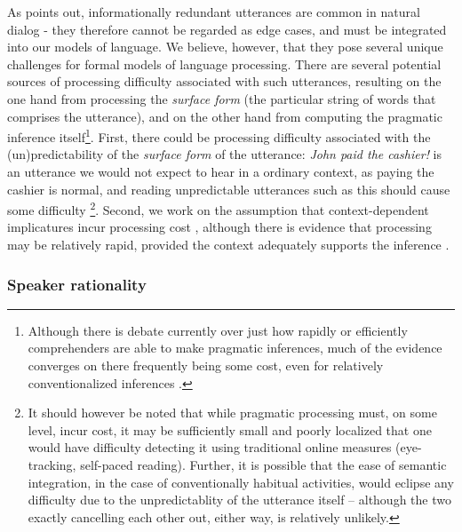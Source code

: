 As \citet{Walker1993} points out, informationally redundant utterances are
common in natural dialog - they therefore cannot be regarded as edge
cases, and must be integrated into our models of language. We believe,
however, that they pose several unique challenges for formal models of
language processing. There are several potential sources of processing
difficulty associated with such utterances, resulting on the one hand
from processing the \emph{surface form} (the particular string of words
that comprises the utterance), and on the other hand from computing the
pragmatic inference itself\footnote{Although there is debate currently
  over just how rapidly or efficiently comprehenders are able to make
  pragmatic inferences, much of the evidence converges on there
  frequently being some cost, even for relatively conventionalized
  inferences \citep{Degen2016}.}. First, there could be
processing difficulty associated with the (un)predictability of the
\emph{surface form} of the utterance: \emph{John paid the cashier!} is
an utterance we would not expect to hear in a ordinary context, as
paying the cashier is normal, and reading unpredictable utterances such
as this should cause some difficulty \citep{Smith2013}\footnote{It
  should however be noted that while pragmatic processing must, on some
  level, incur cost, it may be sufficiently small and poorly localized
  that one would have difficulty detecting it using traditional online
  measures (eye-tracking, self-paced reading). Further, it is possible
  that the ease of semantic integration, in the case of conventionally
  habitual activities, would eclipse any difficulty due to the
  unpredictablity of the utterance itself -- although the two exactly
  cancelling each other out, either way, is relatively unlikely.}.
Second, we work on the assumption that context-dependent implicatures
incur processing cost \citep{Levinson2000, Sedivy2007}, although there is
evidence that processing may be relatively rapid, provided the context
adequately supports the inference \citep{Degen2015a, Grodner2010}.

\subsubsection{Speaker rationality}\label{speaker-rationality}

